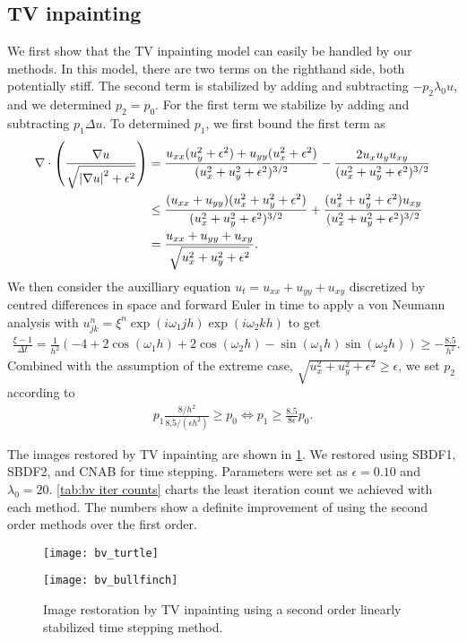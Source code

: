 \subsection{TV inpainting}
We first show that the TV inpainting model can easily be handled by our methods. In this model, there are two terms on the righthand side, both potentially stiff.  The second term is  stabilized by adding and subtracting $-p_2\lambda_0 u$, and we determined $p_2=p_0$. For the first term we stabilize by adding and subtracting $p_1\Delta u$. To determined $p_1$, we first bound the first term as 
\begin{align}
\begin{split}
        \nabla \cdot \left(\frac{\nabla u}{\sqrt{\left|\nabla u\right|^2 + \epsilon^2}} \right) 
&= \frac{u_{xx}(u_y^2 + \epsilon^2) + u_{yy}(u_x^2 + \epsilon^2)}{(u_x^2 + u_y^2 + \epsilon^2)^{3/2}} 
- \frac{2u_xu_y u_{xy}}{(u_x^2 + u_y^2 + \epsilon^2)^{3/2}} 
\\
&\leq \frac{(u_{xx}+u_{yy})(u_x^2 + u_y^2 + \epsilon^2)}{(u_x^2 + u_y^2 + \epsilon^2)^{3/2}} + \frac{(u_x^2 + u_y^2 + \epsilon^2)u_{xy}}{(u_x^2 + u_y^2 + \epsilon^2)^{3/2}}  
\\
&= \frac{u_{xx} + u_{yy} + u_{xy}}{\sqrt{u_x^2 + u_y^2 + \epsilon^2}}.
\end{split}
\label{p1 estimate inpaint 1}
\end{align}
We then consider the auxilliary equation $u_t = u_{xx} + u_{yy} + u_{xy}$ discretized by centred differences in space and forward Euler in time to apply a von Neumann analysis with $u^n_{jk} = \xi^n \exp(i\omega_1jh)\exp(i\omega_2kh)$ to get 
\begin{align}
        \frac{\xi  - 1}{\Delta t} 
= \frac{1}{h^2}(-4 + 2\cos(\omega_1 h) + 2\cos(\omega_2 h) - \sin(\omega_1 h)\sin(\omega_2h))
\geq -\frac{8.5}{h^2}.
\label{p1 estimate inpaint 2}
\end{align}
Combined with the assumption of the extreme case, $\sqrt{u_x^2 + u_y^2 + \epsilon^2} \geq \epsilon$, we set $p_2$ according to 
\begin{align}
        p_1\frac{8/h^2}{8.5/(\epsilon h^2)} \geq p_0 \iff 
p_1 \geq \frac{8.5}{8\epsilon}p_0.
\end{align}

The images restored by TV inpainting are shown in \cref{fig:bv inpainting}. We restored using SBDF1, SBDF2, and CNAB for time stepping. Parameters were set as $\epsilon=0.10$ and $\lambda_0=20$. \cref{tab:bv iter counts} charts the least iteration count we achieved with each method. The numbers show a definite improvement of using the second order methods over the first order. 
\begin{figure}[htb!]
\centering
\begin{minipage}{0.65\textwidth}
	\texttt{[image: bv\_turtle]}
\end{minipage}
\begin{minipage}{0.65\textwidth}
	\texttt{[image: bv\_bullfinch]}
\end{minipage}
\caption[Image restoration by TV inpainting.]{Image restoration by TV inpainting using a second order linearly stabilized time stepping method.}
\label{fig:bv inpainting}
\end{figure}

